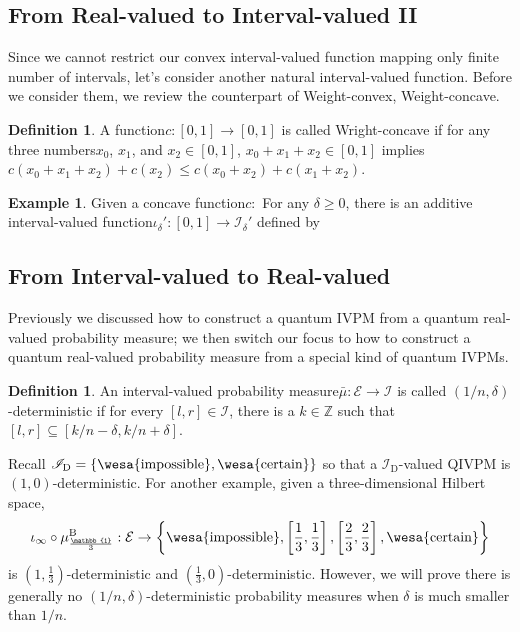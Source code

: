 \documentclass[12pt]{iopart}
\theoremstyle{plain}
\theoremstyle{definition}
\newtheorem{definition}[thm]{Definition}
\newtheorem{example}[thm]{Example}
\theoremstyle{remark}
\newcommand{\events}{\ensuremath{\mathcal{E}}}
\newcommand{\imposs}{{\mbox{\wesa{impossible}}}}
\newcommand{\necess}{{\mbox{\wesa{certain}}}}
\newcommand{\nb}{\nolinebreak[1] }
\begin{document}
\subsection{From Real-valued to Interval-valued II}

Since we cannot restrict our convex interval-valued function mapping
only finite number of intervals, let's consider another natural interval-valued
function. Before we consider them, we review the counterpart of Weight-convex,
Weight-concave\nb\cite{PecaricTong1992,Brzdek_2014}.

\begin{definition}A function\nb$c:\left[0,1\right]\rightarrow\left[0,1\right]$
is called Wright-concave if for any three numbers\nb$x_{0}$, $x_{1}$,
and $x_{2}\in\left[0,1\right]$, $x_{0}+x_{1}+x_{2}\in\left[0,1\right]$
implies $c\left(x_{0}+x_{1}+x_{2}\right)+c\left(x_{2}\right)\le c\left(x_{0}+x_{2}\right)+c\left(x_{1}+x_{2}\right)$.\end{definition}

\begin{example}Given a concave function\nb$c:$ For any $\delta\ge0$,
there is an additive interval-valued function\nb$\iota_{\delta}':\left[0,1\right]\rightarrow\mathscr{I}_{\delta}'$
defined by\end{example}

\subsection{From Interval-valued to Real-valued}

Previously we discussed how to construct a quantum IVPM from a quantum
real-valued probability measure; we then switch our focus to how to
construct a quantum real-valued probability measure from a special
kind of quantum IVPMs.

\begin{definition}\label{def:delta-deterministic}An interval-valued
probability measure\nb$\bar{\mu}:\events\rightarrow\mathscr{I}$
is called $\left(1/n,\delta\right)$-deterministic if for every $\left[l,r\right]\in\mathscr{I}$,
there is a $k\in\mathbb{Z}$ such that $\left[l,r\right]\subseteq\left[k/n-\delta,k/n+\delta\right]$.\end{definition}

Recall $\mathscr{I}_{\mathrm{D}}=\left\{ \imposs,\necess\right\} $
so that a $\mathscr{I}_{\mathrm{D}}$-valued QIVPM is $\left(1,0\right)$-deterministic.
For another example, given a three-dimensional Hilbert space, 
\begin{equation}
\iota_{\infty}\circ\mu_{\frac{\mathbb{1}}{3}}^{\mathrm{B}}:\events\rightarrow\left\{ \imposs,\left[\frac{1}{3},\frac{1}{3}\right],\left[\frac{2}{3},\frac{2}{3}\right],\necess\right\} 
\end{equation}
is $\left(1,\frac{1}{3}\right)$-deterministic and $\left(\frac{1}{3},0\right)$-deterministic.
However, we will prove there is generally no $\left(1/n,\delta\right)$-deterministic
probability measures when $\delta$ is much smaller than $1/n$.
\end{document}

